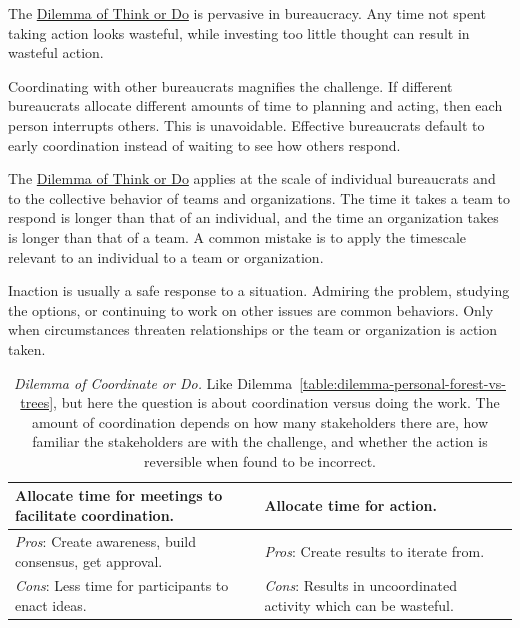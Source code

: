 The \hyperref[table:dilemma-personal-forest-vs-trees]{Dilemma of Think or Do} is pervasive in bureaucracy. Any time not spent taking action looks wasteful, while investing too little thought can result in wasteful action. 

Coordinating with other bureaucrats magnifies the challenge. If different bureaucrats allocate different amounts of time to planning and acting, then each person interrupts others. This is unavoidable. Effective bureaucrats default to early coordination instead of waiting to see how others respond.

The \hyperref[table:dilemma-personal-forest-vs-trees]{Dilemma of Think or Do} applies at the scale of individual bureaucrats and to the collective behavior of teams and organizations. The time it takes a team to respond is longer than that of an individual, and the time an organization takes is longer than that of a team.  A common mistake is to apply the timescale relevant to an individual to a team or organization.

Inaction is usually a safe response to a situation. Admiring the problem, studying the options, or continuing to work on other issues are common behaviors. Only when circumstances threaten relationships or the team or organization is action taken.

\begin{center}
\begin{table}[H] %
\begin{tabular}{ | m{\dilemmatablewidth}| m{\dilemmatablewidth} | } 
  \hline
  \textbf{Allocate time for meetings to facilitate coordination.} &
  \textbf{Allocate time for action.} \\
  \hline
  \textit{Pros}: Create awareness, build consensus, get approval. &
  \textit{Pros}: Create results to iterate from. \\
  \hline
  \textit{Cons}: Less time for participants to enact ideas. & 
  \textit{Cons}: Results in uncoordinated activity which can be wasteful. \\
  \hline
\end{tabular}
\caption{\textit{Dilemma of Coordinate or Do.}
Like Dilemma~\ref{table:dilemma-personal-forest-vs-trees}, but here the question is about coordination versus doing the work. The amount of coordination depends on how many stakeholders there are, how familiar the stakeholders are with the challenge, and whether the action is reversible when found to be incorrect.
}
\label{table:dilemma-personal-meetings-versus-work}
\end{table}
\end{center}

